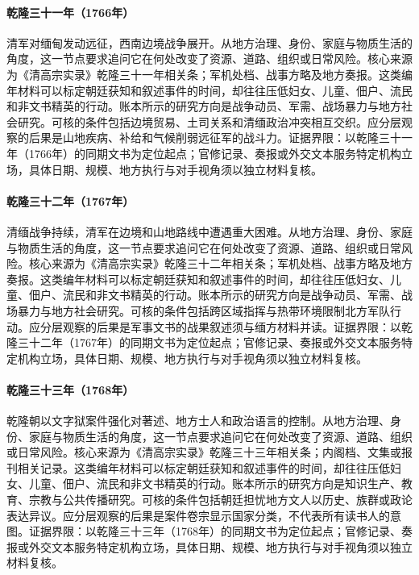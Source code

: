 \hypertarget{social:EQ-1766-BURMA-WAR-BEGIN}{}\paragraph{乾隆三十一年（1766年）}清军对缅甸发动远征，西南边境战争展开。从地方治理、身份、家庭与物质生活的角度，这一节点要求追问它在何处改变了资源、道路、组织或日常风险。核心来源为《清高宗实录》乾隆三十一年相关条；军机处档、战事方略及地方奏报。这类编年材料可以标定朝廷获知和叙述事件的时间，却往往压低妇女、儿童、佃户、流民和非文书精英的行动。账本所示的研究方向是战争动员、军需、战场暴力与地方社会研究。可核的条件包括边境贸易、土司关系和清缅政治冲突相互交织。应分层观察的后果是山地疾病、补给和气候削弱远征军的战斗力。证据界限：以乾隆三十一年（1766年）的同期文书为定位起点；官修记录、奏报或外交文本服务特定机构立场，具体日期、规模、地方执行与对手视角须以独立材料复核。
\hypertarget{social:EQ-1767-BURMA-CAMPAIGN}{}\paragraph{乾隆三十二年（1767年）}清缅战争持续，清军在边境和山地路线中遭遇重大困难。从地方治理、身份、家庭与物质生活的角度，这一节点要求追问它在何处改变了资源、道路、组织或日常风险。核心来源为《清高宗实录》乾隆三十二年相关条；军机处档、战事方略及地方奏报。这类编年材料可以标定朝廷获知和叙述事件的时间，却往往压低妇女、儿童、佃户、流民和非文书精英的行动。账本所示的研究方向是战争动员、军需、战场暴力与地方社会研究。可核的条件包括跨区域指挥与热带环境限制北方军队行动。应分层观察的后果是军事文书的战果叙述须与缅方材料并读。证据界限：以乾隆三十二年（1767年）的同期文书为定位起点；官修记录、奏报或外交文本服务特定机构立场，具体日期、规模、地方执行与对手视角须以独立材料复核。
\hypertarget{social:EQ-1768-LITERARY-INQUISITION}{}\paragraph{乾隆三十三年（1768年）}乾隆朝以文字狱案件强化对著述、地方士人和政治语言的控制。从地方治理、身份、家庭与物质生活的角度，这一节点要求追问它在何处改变了资源、道路、组织或日常风险。核心来源为《清高宗实录》乾隆三十三年相关条；内阁档、文集或报刊相关记录。这类编年材料可以标定朝廷获知和叙述事件的时间，却往往压低妇女、儿童、佃户、流民和非文书精英的行动。账本所示的研究方向是知识生产、教育、宗教与公共传播研究。可核的条件包括朝廷担忧地方文人以历史、族群或政论表达异议。应分层观察的后果是案件卷宗显示国家分类，不代表所有读书人的意图。证据界限：以乾隆三十三年（1768年）的同期文书为定位起点；官修记录、奏报或外交文本服务特定机构立场，具体日期、规模、地方执行与对手视角须以独立材料复核。
